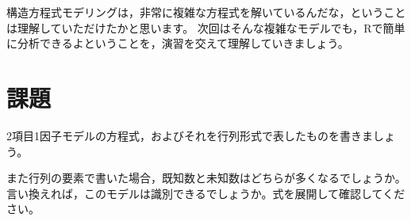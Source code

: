\documentclass{ltjsbook}
\begin{document}
構造方程式モデリングは，非常に複雑な方程式を解いているんだな，ということは理解していただけたかと思います。
次回はそんな複雑なモデルでも，Rで簡単に分析できるよということを，演習を交えて理解していきましょう。
\section{課題}
2項目1因子モデルの方程式，およびそれを行列形式で表したものを書きましょう。

また行列の要素で書いた場合，既知数と未知数はどちらが多くなるでしょうか。言い換えれば，このモデルは識別できるでしょうか。式を展開して確認してください。
\end{document}
